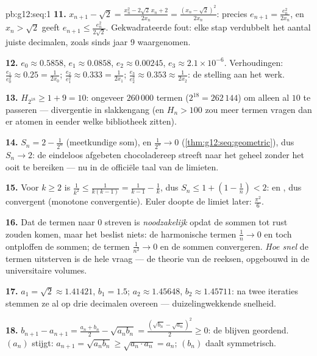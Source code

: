 \begin{solution}{pb:g12:seq:1}
\textbf{11.} $x_{n+1} - \sqrt2 = \frac{x_n^2 - 2\sqrt2\,x_n + 2}{2x_n} =
\frac{(x_n - \sqrt2)^2}{2x_n}$: precies $e_{n+1} = \frac{e_n^2}{2x_n}$, en
$x_n > \sqrt2$ geeft $e_{n+1} \leq \frac{e_n^2}{2\sqrt2}$. Gekwadrateerde
fout: elke stap verdubbelt het aantal juiste decimalen, zoals sinds jaar 9
waargenomen.

\textbf{12.} $e_0 \approx 0.5858$, $e_1 \approx 0.0858$,
$e_2 \approx 0.00245$, $e_3 \approx 2.1 \times 10^{-6}$. Verhoudingen:
$\frac{e_1}{e_0^2} \approx 0.25 = \frac{1}{2x_0}$;
$\frac{e_2}{e_1^2} \approx 0.333 = \frac{1}{2x_1}$;
$\frac{e_3}{e_2^2} \approx 0.353 \approx \frac{1}{2x_2}$: de stelling aan het
werk.

\textbf{13.} $H_{2^{18}} \geq 1 + 9 = 10$: ongeveer $260\,000$ termen
($2^{18} = 262\,144$) om alleen al $10$ te passeren --- divergentie in
slakkengang (en $H_n > 100$ zou meer termen vragen dan er atomen in eender
welke bibliotheek zitten).

\textbf{14.} $S_n = 2 - \frac{1}{2^n}$ (meetkundige som), en
$\frac{1}{2^n} \to 0$ (\cref{thm:g12:seq:geometric}), dus $S_n \to 2$: de
eindeloos afgebeten chocoladereep streeft naar het geheel zonder het ooit te
bereiken --- nu in de officiële taal van de limieten.

\textbf{15.} Voor $k \geq 2$ is
$\frac{1}{k^2} \leq \frac{1}{k(k-1)} = \frac{1}{k-1} - \frac1k$, dus
$S_n \leq 1 + \left(1 - \frac1n\right) < 2$:  en ,
dus convergent (monotone convergentie). Euler doopte de limiet later:
$\frac{\pi^2}{6}$.

\textbf{16.} Dat de termen naar $0$ streven is \emph{noodzakelijk} opdat de
sommen tot rust zouden komen, maar het beslist niets: de harmonische termen
$\frac1n \to 0$ en toch ontploffen de sommen; de termen
$\frac{1}{n^2} \to 0$ en de sommen convergeren. \emph{Hoe snel} de termen
uitsterven is de hele vraag --- de theorie van de reeksen, opgebouwd in de
universitaire volumes.

\textbf{17.} $a_1 = \sqrt2 \approx 1.41421$, $b_1 = 1.5$;
$a_2 \approx 1.45648$, $b_2 \approx 1.45711$: na twee iteraties stemmen ze al
op drie decimalen overeen --- duizelingwekkende snelheid.

\textbf{18.} $b_{n+1} - a_{n+1} = \frac{a_n + b_n}{2} - \sqrt{a_n b_n} =
\frac{(\sqrt{b_n} - \sqrt{a_n})^2}{2} \geq 0$: de  blijven
geordend. $(a_n)$ stijgt:
$a_{n+1} = \sqrt{a_n b_n} \geq \sqrt{a_n \cdot a_n} = a_n$; $(b_n)$ daalt
symmetrisch.


\end{solution}
